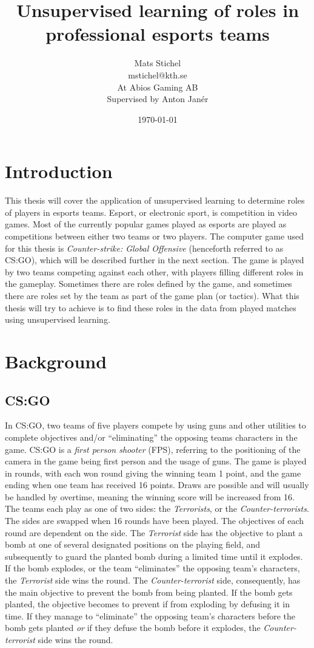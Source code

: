\documentclass{article}
\title{Unsupervised learning of roles in professional esports teams}
\author{Mats Stichel \\ mstichel@kth.se \\ At Abios Gaming AB \\ Supervised by Anton Janér}
\date{\today}
\begin{document}
\maketitle

\section{Introduction}
This thesis will cover the application of unsupervised learning to determine roles of players in esports teams. Esport, or electronic sport, is competition in video games. Most of the currently popular games played as esports are played as competitions between either two teams or two players. The computer game used for this thesis is {\it Counter-strike: Global Offensive} (henceforth referred to as CS:GO), which will be described further in the next section. The game is played by two teams competing against each other, with players filling different roles in the gameplay. Sometimes there are roles defined by the game, and sometimes there are roles set by the team as part of the game plan (or tactics). What this thesis will try to achieve is to find these roles in the data from played matches using unsupervised learning.

\section{Background}
\subsection{CS:GO}
In CS:GO, two teams of five players compete by using guns and other utilities to complete objectives and/or ``eliminating'' the opposing teams characters in the game. CS:GO is a {\it first person shooter} (FPS), referring to the positioning of the camera in the game being first person and the usage of guns. The game is played in rounds, with each won round giving the winning team 1 point, and the game ending when one team has received 16 points. Draws are possible and will usually be handled by overtime, meaning the winning score will be increased from 16. The teams each play as one of two sides: the {\it Terrorists}, or the {\it Counter-terrorists}. The sides are swapped when 16 rounds have been played. The objectives of each round are dependent on the side. The {\it Terrorist} side has the objective to plant a bomb at one of several designated positions on the playing field, and subsequently to guard the planted bomb during a limited time until it explodes. If the bomb explodes, or the team ``eliminates'' the opposing team's characters, the {\it Terrorist} side wins the round. The {\it Counter-terrorist} side, consequently, has the main objective to prevent the bomb from being planted. If the bomb gets planted, the objective becomes to prevent if from exploding by defusing it in time. If they manage to ``eliminate'' the opposing team's characters before the bomb gets planted {\it or} if they defuse the bomb before it explodes, the {\it Counter-terrorist} side wins the round.
\end{document}
